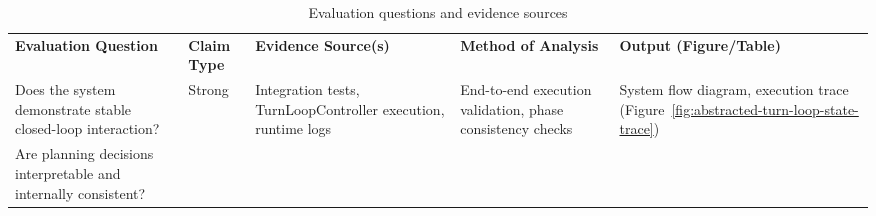 \begin{longtable}[]{@{}
  >{\raggedright\arraybackslash}p{}
  >{\raggedright\arraybackslash}p{}
  >{\raggedright\arraybackslash}p{}
  >{\raggedright\arraybackslash}p{}
  >{\raggedright\arraybackslash}p{}@{}}
\caption{Evaluation questions and evidence sources}\label{tab:evaluation-framework}\\
\toprule\noalign{}
\begin{minipage}[b]{\linewidth}\centering
\textbf{Evaluation Question}
\end{minipage} & \begin{minipage}[b]{\linewidth}\centering
\textbf{Claim Type}
\end{minipage} & \begin{minipage}[b]{\linewidth}\centering
\textbf{Evidence Source(s)}
\end{minipage} & \begin{minipage}[b]{\linewidth}\centering
\textbf{Method of Analysis}
\end{minipage} & \begin{minipage}[b]{\linewidth}\centering
\textbf{Output (Figure/Table)}
\end{minipage} \\
\begin{minipage}[b]{\linewidth}\raggedright
Does the system demonstrate stable closed-loop interaction?
\end{minipage} & \begin{minipage}[b]{\linewidth}\raggedright
Strong
\end{minipage} & \begin{minipage}[b]{\linewidth}\raggedright
Integration tests, TurnLoopController execution, runtime logs
\end{minipage} & \begin{minipage}[b]{\linewidth}\raggedright
End-to-end execution validation, phase consistency checks
\end{minipage} & \begin{minipage}[b]{\linewidth}\raggedright
System flow diagram, execution trace (Figure~\ref{fig:abstracted-turn-loop-state-trace})
\end{minipage} \\
\begin{minipage}[b]{\linewidth}\raggedright
Are planning decisions interpretable and internally consistent?

\end{minipage}
\end{longtable}
